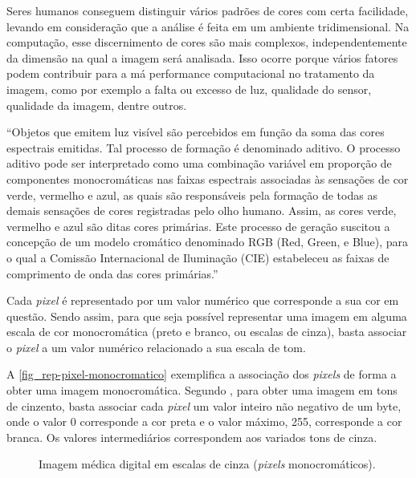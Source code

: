 Seres humanos conseguem distinguir vários padrões de cores com certa facilidade, levando em consideração que a análise é feita em um ambiente tridimensional. Na computação, esse discernimento de cores são mais complexos, independentemente da dimensão na qual a imagem será analisada. Isso ocorre porque vários fatores podem contribuir para a má performance computacional no tratamento da imagem, como por exemplo a falta ou excesso de luz, qualidade do sensor, qualidade da imagem, dentre outros.

\begin{citacao}
“Objetos que emitem luz visível são percebidos em função da soma das cores espectrais emitidas. Tal processo de formação é denominado aditivo. O processo aditivo pode ser interpretado como uma combinação variável em proporção de componentes monocromáticas nas faixas espectrais associadas às sensações de cor verde, vermelho e azul, as quais são responsáveis pela formação de todas as demais sensações de cores registradas pelo olho humano. Assim, as cores verde, vermelho e azul são ditas cores primárias. Este processo de geração suscitou a concepção de um modelo cromático denominado RGB (Red, Green, e Blue), para o qual a Comissão Internacional de Iluminação (CIE) estabeleceu as faixas de comprimento de onda das cores primárias.” \cite{QUEIROZ2006}
\end{citacao}

Cada \textit{pixel} é representado por um valor numérico que corresponde a sua cor em questão. Sendo assim, para que seja possível representar uma imagem em alguma escala de cor monocromática (preto e branco, ou escalas de cinza), basta associar o \textit{pixel} a um valor numérico relacionado a sua escala de tom.

A \autoref{fig_rep-pixel-monocromatico} exemplifica a associação dos \textit{pixels} de forma a obter uma imagem monocromática. Segundo , para obter uma imagem em tons de cinzento, basta associar cada \textit{pixel} um valor inteiro não negativo de um byte, onde o valor 0 corresponde a cor preta e o valor máximo, 255, corresponde a cor branca. Os valores intermediários correspondem aos variados tons de cinza.

\begin{figure}[h]
	\caption{\label{fig_rep-pixel-monocromatico}Imagem médica digital em escalas de cinza (\textit{pixels} monocromáticos).}
	\begin{center}
	\end{center}
	\centering {}
\end{figure}

